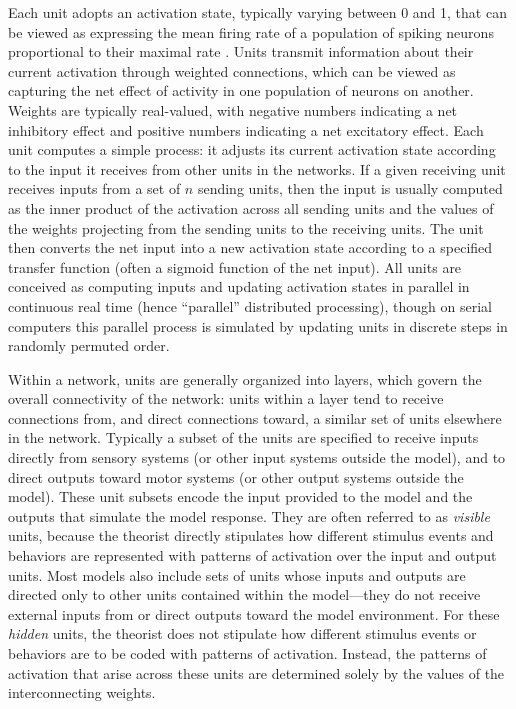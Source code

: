 Each unit adopts an activation state, typically varying between 0 and 1, that can be viewed as expressing the mean firing rate of a population of spiking neurons proportional to their maximal rate \cite{ZipserAndersen88}. Units transmit information about their current activation through weighted connections, which can be viewed as capturing the net effect of activity in one population of neurons on another. Weights are typically real-valued, with negative numbers indicating a net inhibitory effect and positive numbers indicating a net excitatory effect. Each unit computes a simple process: it adjusts its current activation state according to the input it receives from other units in the networks. If a given receiving unit receives inputs from a set of $n$ sending units, then the input is usually computed as the inner product of the activation across all sending units and the values of the weights projecting from the sending units to the receiving units. The unit then converts the net input into a new activation state according to a specified transfer function (often a sigmoid function of the net input). All units are conceived as computing inputs and updating activation states in parallel in continuous real time (hence ``parallel'' distributed processing), though on serial computers this parallel process is simulated by updating units in discrete steps in randomly permuted order.

Within a network, units are generally organized into layers, which govern the overall connectivity of the network: units within a layer tend to receive connections from, and direct connections toward, a similar set of units elsewhere in the network. Typically a subset of the units are specified to receive inputs directly from sensory systems (or other input systems outside the model), and to direct outputs toward motor systems (or other output systems outside the model). These unit subsets encode the input provided to the model and the outputs that simulate the model response. They are often referred to as {\em visible} units, because the theorist directly stipulates how different stimulus events and behaviors are represented with patterns of activation over the input and output units. Most models also include sets of units whose inputs and outputs are directed only to other units contained within the model---they do not receive external inputs from or direct outputs toward the model environment. For these {\em hidden} units, the theorist does not stipulate how different stimulus events or behaviors are to be coded with patterns of activation. Instead, the patterns of activation that arise across these units are determined solely by the values of the interconnecting weights. 

